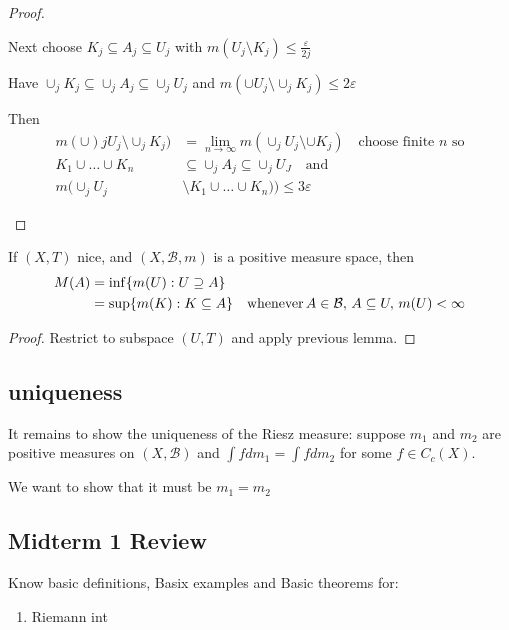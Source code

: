 \begin{proof}
\begin{enumerate}
	Next choose $K_j \subseteq A_j \subseteq U_j$ with  $m(U_j \setminus K_j) \leq \frac{\varepsilon}{2j}$ 

	Have $\cup_j K_j \subseteq \cup_j A_j \subseteq \cup_j U_j$ and  $m(\cup U_j \setminus \cup_j K_j ) \leq 2 \varepsilon$ 

	Then 
	\begin{align*}
		m( \cup)j U_j \setminus \cup_j K_j) &= \lim_{n \to \infty} m ( \cup_j U_j \setminus \cup K_j) \quad \text{choose finite $n$ so} \\
		K_1 \cup \ldots \cup K_n &\subseteq \cup_j A_j \subseteq \cup_j U_J \quad \text{and} \\
		m(\cup_j U_j &\setminus K_1 \cup \ldots \cup K_n )) \leq 3\varepsilon
	\end{align*} 
\end{enumerate}

\end{proof}

\begin{lemma}
	If $(X, T)$ nice, and $(X,\mathcal{B}, m)$ is a positive measure space, then
	\begin{align*}
		M(A) &= \inf\{m(U) : U \supseteq A\} \\
			 &= \sup \{m(K) : K \subseteq A \} \quad \text{whenever} \, A \in \mathcal{B},
			 \, A \subseteq U, \, m(U) < \infty
	\end{align*}
\end{lemma}

\begin{proof}
	Restrict to subspace $(U,T)$ and apply previous lemma.
\end{proof}

\subsection*{uniqueness}
It remains to show the uniqueness of the Riesz measure: suppose $m_1$ and $m_2$ are positive measures on $(X,\mathcal{B})$ and $\int f dm_1 = \int f dm_2$ for some  $f \in C_c(X)$.


We want to show that it must be  $m_1 = m_2$

\subsection*{Midterm 1 Review}
Know basic definitions, Basix examples and Basic theorems for:
\begin{enumerate}
	\item Riemann int
\end{enumerate}
